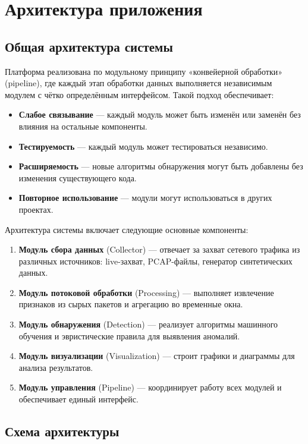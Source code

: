 \chapter{Архитектура приложения}

\section{Общая архитектура системы}

Платформа реализована по модульному принципу «конвейерной обработки» (pipeline), где каждый этап обработки данных выполняется независимым модулем с чётко определённым интерфейсом. Такой подход обеспечивает:

\begin{itemize}
    \item \textbf{Слабое связывание} — каждый модуль может быть изменён или заменён без влияния на остальные компоненты.
    \item \textbf{Тестируемость} — каждый модуль может тестироваться независимо.
    \item \textbf{Расширяемость} — новые алгоритмы обнаружения могут быть добавлены без изменения существующего кода.
    \item \textbf{Повторное использование} — модули могут использоваться в других проектах.
\end{itemize}

Архитектура системы включает следующие основные компоненты:

\begin{enumerate}
    \item \textbf{Модуль сбора данных} (Collector) — отвечает за захват сетевого трафика из различных источников: live-захват, PCAP-файлы, генератор синтетических данных.
    \item \textbf{Модуль потоковой обработки} (Processing) — выполняет извлечение признаков из сырых пакетов и агрегацию во временные окна.
    \item \textbf{Модуль обнаружения} (Detection) — реализует алгоритмы машинного обучения и эвристические правила для выявления аномалий.
    \item \textbf{Модуль визуализации} (Visualization) — строит графики и диаграммы для анализа результатов.
    \item \textbf{Модуль управления} (Pipeline) — координирует работу всех модулей и обеспечивает единый интерфейс.
\end{enumerate}

\section{Схема архитектуры}

